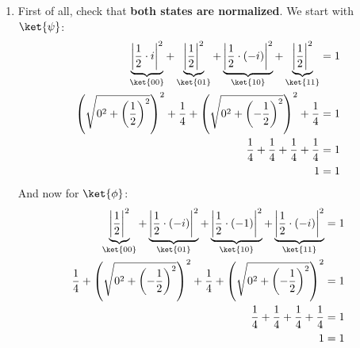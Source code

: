 \begin{enumerate}
    \item First of all, check that \textbf{both states are normalized}. We start with $\ket{\psi}$:
    \begin{align*}
        \underbrace{\left|\frac{1}{2} \cdot i\right|^{2}}_{\ket{00}} + \underbrace{\left|\frac{1}{2}\right|^{2}}_{\ket{01}} + \underbrace{\left|\frac{1}{2} \cdot (-i)\right|^{2}}_{\ket{10}} + \underbrace{\left|\frac{1}{2}\right|^{2}}_{\ket{11}} &= 1 \\
        \left(\sqrt{0^2 + \left(\frac{1}{2}\right)^2}\right)^{2} + \frac{1}{4} + \left(\sqrt{0^2 + \left(-\frac{1}{2}\right)^2}\right)^{2} + \frac{1}{4} &= 1 \\
        \frac{1}{4} + \frac{1}{4} + \frac{1}{4} + \frac{1}{4} &= 1 \\
        1 &= 1
    \end{align*}
    And now for $\ket{\phi}$:
    \begin{align*}
        \underbrace{\left|\frac{1}{2}\right|^{2}}_{\ket{00}} + \underbrace{\left|\frac{1}{2} \cdot (-i)\right|^{2}}_{\ket{01}} + \underbrace{\left|\frac{1}{2} \cdot (-1)\right|^{2}}_{\ket{10}} + \underbrace{\left|\frac{1}{2} \cdot (-i)\right|^{2}}_{\ket{11}} &= 1 \\
        \frac{1}{4} + \left(\sqrt{0^2 + \left(-\frac{1}{2}\right)^2}\right)^{2} + \frac{1}{4} + \left(\sqrt{0^2 + \left(-\frac{1}{2}\right)^2}\right)^{2} &= 1 \\
        \frac{1}{4} + \frac{1}{4} + \frac{1}{4} + \frac{1}{4} &= 1 \\
        1 &= 1
    \end{align*}



\end{enumerate}
